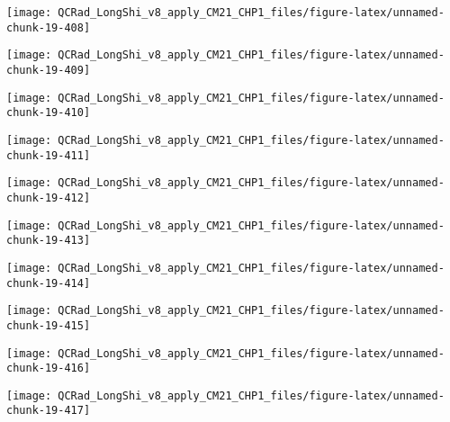 \documentclass[
  10pt,
  a4paper,oneside]{article}
\begin{document}
\begin{center}\texttt{[image: QCRad\_LongShi\_v8\_apply\_CM21\_CHP1\_files/figure-latex/unnamed-chunk-19-408]} \end{center}

\begin{center}\texttt{[image: QCRad\_LongShi\_v8\_apply\_CM21\_CHP1\_files/figure-latex/unnamed-chunk-19-409]} \end{center}

\begin{center}\texttt{[image: QCRad\_LongShi\_v8\_apply\_CM21\_CHP1\_files/figure-latex/unnamed-chunk-19-410]} \end{center}

\begin{center}\texttt{[image: QCRad\_LongShi\_v8\_apply\_CM21\_CHP1\_files/figure-latex/unnamed-chunk-19-411]} \end{center}

\begin{center}\texttt{[image: QCRad\_LongShi\_v8\_apply\_CM21\_CHP1\_files/figure-latex/unnamed-chunk-19-412]} \end{center}

\begin{center}\texttt{[image: QCRad\_LongShi\_v8\_apply\_CM21\_CHP1\_files/figure-latex/unnamed-chunk-19-413]} \end{center}

\begin{center}\texttt{[image: QCRad\_LongShi\_v8\_apply\_CM21\_CHP1\_files/figure-latex/unnamed-chunk-19-414]} \end{center}

\begin{center}\texttt{[image: QCRad\_LongShi\_v8\_apply\_CM21\_CHP1\_files/figure-latex/unnamed-chunk-19-415]} \end{center}

\begin{center}\texttt{[image: QCRad\_LongShi\_v8\_apply\_CM21\_CHP1\_files/figure-latex/unnamed-chunk-19-416]} \end{center}

\begin{center}\texttt{[image: QCRad\_LongShi\_v8\_apply\_CM21\_CHP1\_files/figure-latex/unnamed-chunk-19-417]} \end{center}
\end{document}
